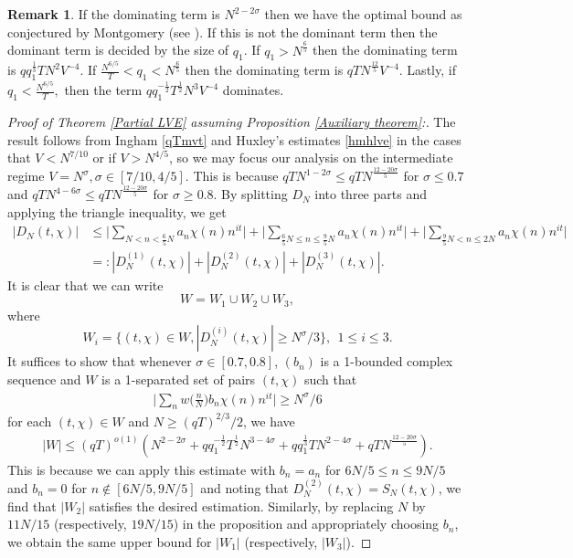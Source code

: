 \documentclass[12pt]{amsart}
\theoremstyle{definition}
\newtheorem{remark}[theorem]{Remark}
\theoremstyle{plain}
\theoremstyle{remark}
\numberwithin{equation}{section}
\numberwithin{theorem}{section}
\numberwithin{equation}{section}
\begin{document}
	\begin{remark}
		If the dominating term is $N^{2-2\sigma}$ then we have the optimal bound as conjectured by Montgomery (see \cite[Equation (4)]{HBLV}). If this is not the dominant term then the dominant term is decided by the size of $q_1$. If $q_1 > N^{\frac{6}{5}}$ then the dominating term is $qq_1^{\frac{1}{3}}TN^{2}V^{-4}$. If $\frac{N^{6/5}}{T}< q_1 < N^{\frac{6}{5}}$ then the dominating term is $qTN^{\frac{12}{5}}V^{-4}$. Lastly, if $q_1 < \frac{N^{6/5}}{T},$ then the term $qq_1^{-\frac{1}{2}}T^{\frac{1}{2}}N^{3}V^{-4}$ dominates.
	\end{remark}
	
	\vspace{1 pt} 
	
	\begin{proof}[Proof of Theorem \ref{Partial LVE} assuming Proposition \ref{Auxiliary theorem}:] The result follows from Ingham \eqref{qTmvt} and Huxley's estimates \eqref{hmhlve} in the cases that $V < N^{7/10}$ or if $V > N^{4/5}$, so we may focus our analysis on the intermediate regime $V=N^{\sigma}, \sigma \in [7/10, 4/5]$. This is because $qTN^{1-2\sigma} \leq qTN^{\frac{12-20\sigma}{5}}$ for $\sigma \leq 0.7$ and $qTN^{4-6\sigma} \leq qTN^{\frac{12-20\sigma}{5}}$ for $\sigma \geq 0.8$. By splitting $D_{N}$ into three parts and applying the triangle inequality, we get
		\begin{align*} |D_{N}(t, \chi)| &\leq \bigg|\sum_{N< n < \frac{6}{5}N} a_{n}\chi(n)n^{it}\bigg| + \bigg|\sum_{\frac{6}{5}N \leq n \leq \frac{9}{5}N} a_{n}\chi(n)n^{it}\bigg| + \bigg|\sum_{\frac{9}{5}N< n \leq 2N} a_{n}\chi(n)n^{it}\bigg|
			\\
			&=: |D^{(1)}_{N}(t, \chi)|+|D^{(2)}_{N}(t, \chi)|+|D^{(3)}_{N}(t, \chi)|.
		\end{align*}
		It is clear that we can write 
		\[ W=W_{1}\cup W_{2} \cup W_{3},
		\]
		where 
		\[W_{i}=\{ (t, \chi) \in W, |D^{(i)}_{N}(t, \chi)| \geq N^{\sigma}/3\}, \ \ 1\leq i \leq 3.\]
		It suffices to show that whenever $\sigma \in [0.7, 0.8]$, $(b_n)$ is a 1-bounded complex sequence and $W$ is a 1-separated set of pairs $(t,\chi)$ such that
		\begin{align*}
			\bigg| \sum_n w\bigg(\frac{n}{N}\bigg) b_n \chi(n) n^{it} \bigg| \geq N^{\sigma}/6
		\end{align*}
		for each $(t,\chi) \in W$ and $N \geq(qT)^{2/3}/2$, we have 
		\begin{align*}
			|W| \leq (qT)^{o(1)} (N^{2-2\sigma}+ qq_1^{-\frac{1}{2}}T^{\frac{1}{2}}N^{3-4\sigma}+ q q_1^{\frac{1}{3}}TN^{2-4\sigma} + qTN^{\frac{12-20\sigma}{5}}).
		\end{align*}
		This is because we can apply this estimate with $b_{n}=a_{n}$ for $6N/5 \leq n \leq 9N/5$ and $b_{n}=0$ for $n \notin [6N/5, 9N/5]$ and noting that $D^{(2)}_{N}(t, \chi)=S_{N}(t, \chi)$, we find that $|W_{2}|$ satisfies the desired estimation. Similarly, by replacing $N$ by $11N/15$ (respectively, $19N/15$) in the proposition and appropriately choosing $b_{n}$, we obtain the same upper bound for $|W_{1}|$ (respectively, $|W_{3}|$). 
		

\end{proof}
\end{document}
